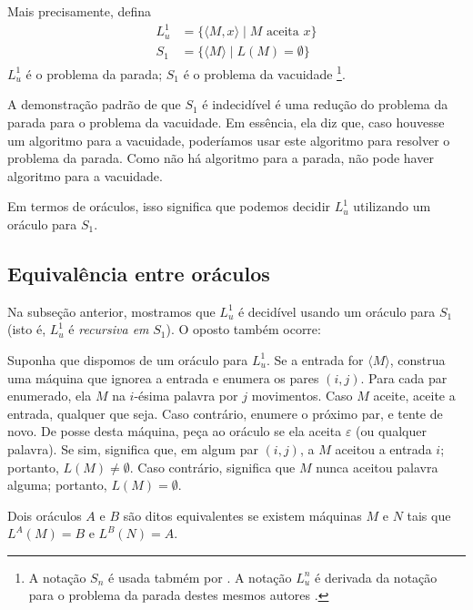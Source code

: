 Mais precisamente, defina
\begin{align*}
    L_u^1 &= \{ \langle M, x \rangle \mid M \text{ aceita } x \} \\
    S_1 &= \{ \langle M \rangle \mid L(M) = \emptyset \}
\end{align*}
$L_u^1$ é o problema da parada; $S_1$ é o problema da vacuidade%
\footnote{
    A notação $S_n$ é usada tabmém por .
    A notação $L_u^n$ é derivada da notação para o problema da parada
    destes mesmos autores \cite[p. 183]{HopcroftUllman1979}.
}.

A demonstração padrão de que $S_1$ é indecidível
é uma redução do problema da parada para o problema da vacuidade.
Em essência, ela diz que,
caso houvesse um algoritmo para a vacuidade,
poderíamos usar este algoritmo para resolver o problema da parada.
Como não há algoritmo para a parada,
não pode haver algoritmo para a vacuidade.

Em termos de oráculos,
isso significa que podemos decidir $L_u^1$
utilizando um oráculo para $S_1$.

\subsection{Equivalência entre oráculos}

Na subseção anterior,
mostramos que $L_u^1$ é decidível usando um oráculo para $S_1$
(isto é, $L_u^1$ é \emph{recursiva em} $S_1$).
O oposto também ocorre:

Suponha que dispomos de um oráculo para $L_u^1$.
Se a entrada for $\langle M \rangle$,
construa uma máquina que ignorea a entrada
e enumera os pares $(i, j)$.
Para cada par enumerado,
ela $M$ na $i$-ésima palavra por $j$ movimentos.
Caso $M$ aceite, aceite a entrada, qualquer que seja.
Caso contrário, enumere o próximo par, e tente de novo.
De posse desta máquina, peça ao oráculo se ela aceita $\varepsilon$
(ou qualquer palavra).
Se sim, significa que, em algum par $(i, j)$,
a $M$ aceitou a entrada $i$; portanto, $L(M) \neq \emptyset$.
Caso contrário, significa que $M$ nunca aceitou palavra alguma;
portanto, $L(M) = \emptyset$.

\begin{definition}
    Dois oráculos $A$ e $B$ são ditos equivalentes
    se existem máquinas $M$ e $N$ tais que
    $L^A(M) = B$ e $L^B(N) = A$.
\end{definition}

